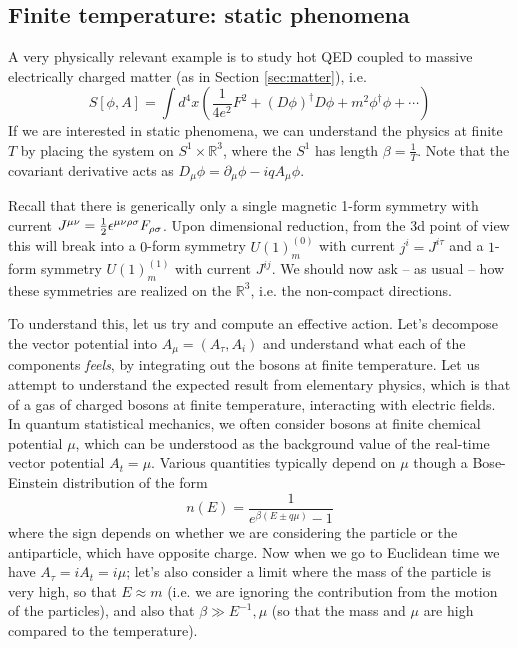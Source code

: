 \documentclass[aps,preprint,nofootinbib,preprintnumbers,eqsecnum,superscriptaddress]{revtex4}
\newcommand{\be}{\begin{equation}}
\newcommand{\ee}{\end{equation}}
\def\le{\left}
\def\ri{\right}
\def\ha{{1\over 2}}
\def\ep{{\epsilon}}
\newcommand{\p}{\partial}
\newcommand\sig{\sigma}
\numberwithin{equation}{section}
\begin{document}
\subsection{Finite temperature: static phenomena}
 A very physically relevant example is to study hot QED coupled to massive electrically charged matter (as in Section \ref{sec:matter}), i.e.
\be
S[\phi, A] = \int d^4x\le(\frac{1}{4e^2} F^2 + (D\phi)^{\dagger} D\phi + m^2 \phi^{\dagger}\phi + \cdots \ri)
\ee
If we are interested in static phenomena, we can understand the physics at finite $T$ by placing the system on $S^1 \times \mathbb{R}^{3}$, where the $S^1$ has length $\beta = \frac{1}{T}$. Note that the covariant derivative acts as $D_{\mu} \phi = \p_{\mu} \phi - i q A_{\mu} \phi$. 

Recall that there is generically only a single magnetic 1-form symmetry with current $J^{\mu\nu} = \ha \ep^{\mu\nu\rho\sig} F_{\rho\sig}$. Upon dimensional reduction, from the 3d point of view this will break into a $0$-form symmetry $U(1)^{(0)}_m$ with current $j^{i} = J^{i\tau}$ and a $1$-form symmetry $U(1)^{(1)}_m$ with current $J^{ij}$. We should now ask -- as usual -- how these symmetries are realized on the $\mathbb{R}^{3}$, i.e. the non-compact directions. 

To understand this, let us try and compute an effective action. Let's decompose the vector potential into $A_{\mu} = (A_{\tau}, A_{i})$ and understand what each of the components {\it feels}, by integrating out the bosons at finite temperature. Let us attempt to understand the expected result from elementary physics, which is that of a gas of charged bosons at finite temperature, interacting with electric fields. In quantum statistical mechanics, we often consider bosons at finite chemical potential $\mu$, which can be understood as the background value of the real-time vector potential $A_{t} = \mu$. Various quantities typically depend on $\mu$ though a Bose-Einstein distribution of the form
\be
n(E) = \frac{1}{e^{\beta (E \pm q\mu)}-1} 
\ee
where the sign depends on whether we are considering the particle or the antiparticle, which have opposite charge. Now when we go to Euclidean time we have $A_{\tau} = i A_t = i \mu$; let's also consider a limit where the mass of the particle is very high, so that $E \approx m$ (i.e. we are ignoring the contribution from the motion of the particles), and also that $\beta \gg E^{-1}, \mu$ (so that the mass and $\mu$ are high compared to the temperature). 
\end{document}
